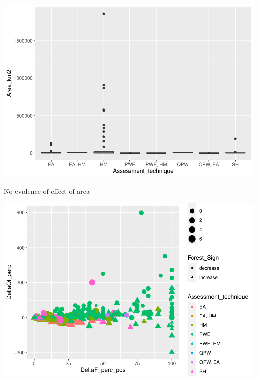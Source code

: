 \documentclass[]{elsarticle} %
\newenvironment{Shaded}{\begin{snugshade}}{\end{snugshade}}
\newcommand{\FloatTok}[1]{\textcolor[rgb]{0.00,0.00,0.81}{#1}}
\newcommand{\KeywordTok}[1]{\textcolor[rgb]{0.13,0.29,0.53}{\textbf{#1}}}
\newcommand{\NormalTok}[1]{#1}
\newcommand{\OperatorTok}[1]{\textcolor[rgb]{0.81,0.36,0.00}{\textbf{#1}}}
\newcommand{\StringTok}[1]{\textcolor[rgb]{0.31,0.60,0.02}{#1}}
\begin{document}
\includegraphics{Forest_and_Water_files/figure-latex/unnamed-chunk-18-1.pdf}

\begin{Shaded}
\end{Shaded}

No evidence of effect of area

\begin{Shaded}
\end{Shaded}

\includegraphics{Forest_and_Water_files/figure-latex/unnamed-chunk-21-1.pdf}
\end{document}
